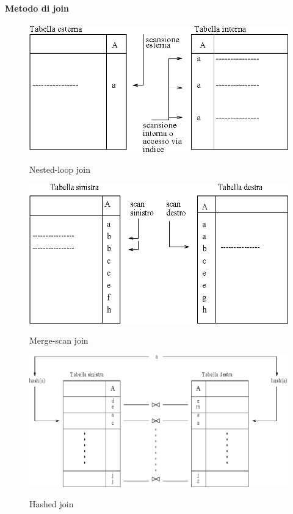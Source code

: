  \paragraph{Metodo di join}
\begin{figure}
  \centering
  \includegraphics[width=13cm]{img/nested.png}\\
  \caption{Nested-loop join}\label{fig:nested}
\end{figure}
\begin{figure}
  \centering
  \includegraphics[width=13cm]{img/merge.png}\\
  \caption{Merge-scan join}\label{fig:merge}
\end{figure}
\begin{figure}
  \centering
  \includegraphics[width=13cm]{img/hashed.png}\\
  \caption{Hashed join}\label{fig:hashed}
\end{figure}
